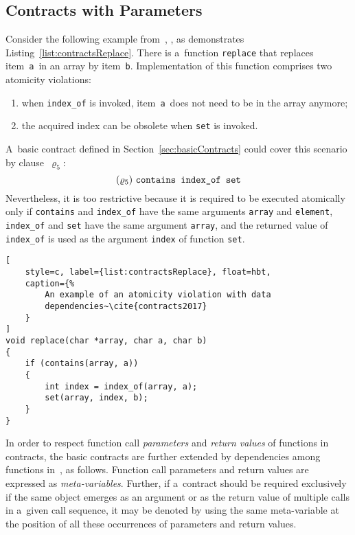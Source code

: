\subsection{Contracts with Parameters}
\label{sec:paramContracts}

\begin{example}
    Consider the following example from~\cite{contracts2017},
    \cite{contracts2015}, as demonstrates Listing~\ref{list:contractsReplace}.
    There is a~function \texttt{replace} that replaces item~\texttt{a}~in an
    array by item~\texttt{b}. Implementation of this function comprises two
    atomicity violations:
    \begin{enumerate}[label={(\roman*)}]
        \item
            when \texttt{index\_of} is invoked, item~\texttt{a}~does not need to
            be in the array anymore;

        \item
            the acquired index can be obsolete when \texttt{set} is invoked.
    \end{enumerate}
    A~basic contract defined in Section~\ref{sec:basicContracts} could cover
    this scenario by clause~$ \varrho_5 $:
    $$ (\varrho_5)\ \text{\texttt{contains index\_of set}} $$
    Nevertheless, it is too restrictive because it is required to be executed
    atomically only if \texttt{contains} and \texttt{index\_of} have the same
    arguments \texttt{array} and \texttt{element}, \texttt{index\_of} and
    \texttt{set} have the same argument \texttt{array}, and the returned value
    of \texttt{index\_of} is used as the argument \texttt{index} of function
    \texttt{set}.
\end{example}

\begin{lstlisting}[
    style=c, label={list:contractsReplace}, float=hbt,
    caption={%
        An example of an atomicity violation with data
        dependencies~\cite{contracts2017}
    }
]
void replace(char *array, char a, char b)
{
    if (contains(array, a))
    {
        int index = index_of(array, a);
        set(array, index, b);
    }
}
\end{lstlisting}

In order to respect function call \emph{parameters} and \emph{return values}
of functions in contracts, the basic contracts are further extended by
dependencies among functions in~\cite{contracts2017}, \cite{contracts2015}
as follows. Function call parameters and return values are expressed as
\emph{meta-variables}. Further, if a~contract should be required exclusively
if the same object emerges as an argument or as the return value of multiple
calls in a~given call sequence, it may be denoted by using the same
meta-variable at the position of all these occurrences of parameters and
return values.

